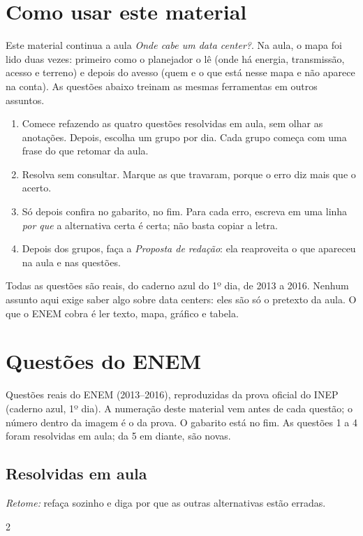 \documentclass[11pt]{article}
\begin{document}
\blocotitulo

\section*{Como usar este material}
Este material continua a aula \emph{Onde cabe um data center?}. Na aula, o mapa foi lido duas vezes: primeiro
como o planejador o lê (onde há energia, transmissão, acesso e terreno) e depois do avesso (quem e o que está
nesse mapa e não aparece na conta). As questões abaixo treinam as mesmas ferramentas em outros assuntos.

\begin{enumerate}
\item Comece refazendo as quatro questões resolvidas em aula, sem olhar as anotações. Depois, escolha um grupo
      por dia. Cada grupo começa com uma frase do que retomar da aula.
\item Resolva sem consultar. Marque as que travaram, porque o erro diz mais que o acerto.
\item Só depois confira no gabarito, no fim. Para cada erro, escreva em uma linha \emph{por que} a alternativa certa
      é certa; não basta copiar a letra.
\item Depois dos grupos, faça a \emph{Proposta de redação}: ela reaproveita o que apareceu na aula e nas questões.
\end{enumerate}

\begin{destaque}[title={Antes de começar}]
Todas as questões são reais, do caderno azul do 1º dia, de 2013 a 2016. Nenhum assunto aqui exige saber algo sobre
data centers: eles são só o pretexto da aula. O que o ENEM cobra é ler texto, mapa, gráfico e tabela.
\end{destaque}

\clearpage
\section{Questões do ENEM}
Questões reais do ENEM (2013--2016), reproduzidas da prova oficial do INEP (caderno azul, 1º dia).
A numeração deste material vem antes de cada questão; o número dentro da imagem é o da prova.
O gabarito está no fim. As questões 1 a 4 foram resolvidas em aula; da 5 em diante, são novas.

\Needspace{0.6\textheight}
\subsection*{Resolvidas em aula}
\emph{Retome:} refaça sozinho e diga por que as outras alternativas estão erradas.
\begin{multicols}{2}\raggedcolumns

\end{multicols}
\end{document}
